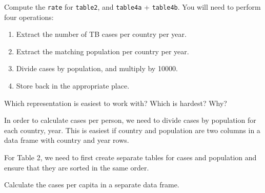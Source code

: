 \documentclass[]{book}
\newenvironment{Shaded}{\begin{snugshade}}{\end{snugshade}}
\newcommand{\DataTypeTok}[1]{\textcolor[rgb]{0.13,0.29,0.53}{#1}}
\newcommand{\DecValTok}[1]{\textcolor[rgb]{0.00,0.00,0.81}{#1}}
\newcommand{\KeywordTok}[1]{\textcolor[rgb]{0.13,0.29,0.53}{\textbf{#1}}}
\newcommand{\NormalTok}[1]{#1}
\newcommand{\OperatorTok}[1]{\textcolor[rgb]{0.81,0.36,0.00}{\textbf{#1}}}
\newcommand{\StringTok}[1]{\textcolor[rgb]{0.31,0.60,0.02}{#1}}
\providecommand{\tightlist}{%
  \setlength{\itemsep}{0pt}\setlength{\parskip}{0pt}}
\theoremstyle{plain}
\theoremstyle{remark}
\theoremstyle{definition}
\theoremstyle{definition}
\theoremstyle{definition}
\theoremstyle{remark}
\begin{document}
Compute the \texttt{rate} for \texttt{table2}, and \texttt{table4a} +
\texttt{table4b}. You will need to perform four operations:

\begin{enumerate}
\def\labelenumi{\arabic{enumi}.}
\tightlist
\item
  Extract the number of TB cases per country per year.
\item
  Extract the matching population per country per year.
\item
  Divide cases by population, and multiply by 10000.
\item
  Store back in the appropriate place.
\end{enumerate}

Which representation is easiest to work with? Which is hardest? Why?

In order to calculate cases per person, we need to divide cases by
population for each country, year. This is easiest if country and
population are two columns in a data frame with country and year rows.

For Table 2, we need to first create separate tables for cases and
population and ensure that they are sorted in the same order.

\begin{Shaded}
\end{Shaded}

Calculate the cases per capita in a separate data frame.

\begin{Shaded}
\end{Shaded}
\end{document}
